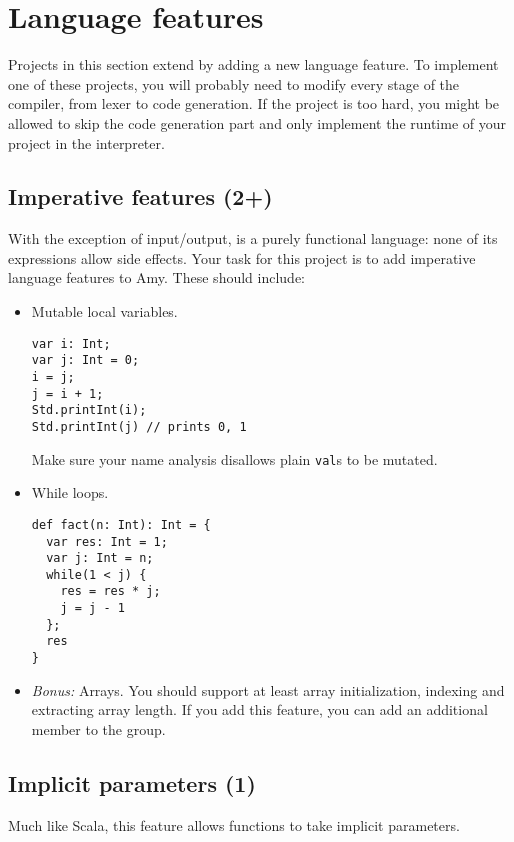 \section{Language features}
Projects in this section extend \langname by adding a new language feature.
To implement one of these projects, you will probably need to modify
every stage of the compiler, from lexer to code generation.
If the project is too hard, you might be allowed to skip the code generation
part and only implement the runtime of your project in the interpreter.


\subsection{Imperative features (2+)}
With the exception of input/output, \langname is a purely functional language:
none of its expressions allow side effects.
Your task for this project is to add imperative language features to Amy.
These should include:

\begin{itemize}
\item Mutable local variables.

\begin{lstlisting}
var i: Int;
var j: Int = 0;
i = j;
j = i + 1;
Std.printInt(i);
Std.printInt(j) // prints 0, 1
\end{lstlisting}

Make sure your name analysis disallows plain \lstinline{val}s to be mutated.

\item While loops.

\begin{lstlisting}
def fact(n: Int): Int = {
  var res: Int = 1;
  var j: Int = n;
  while(1 < j) {
    res = res * j;
    j = j - 1
  };
  res
}
\end{lstlisting}

\item \emph{Bonus:} Arrays.
    You should support at least array initialization,
    indexing and extracting array length.
    If you add this feature,
    you can add an additional member to the group.
\end{itemize}

\subsection{Implicit parameters (1)}
Much like Scala, this feature allows functions to take implicit parameters.

